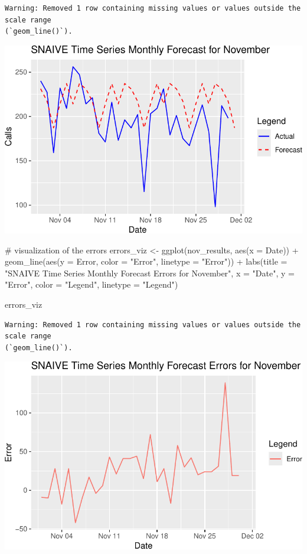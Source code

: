 \documentclass[
  letterpaper,
  DIV=11,
  numbers=noendperiod]{scrartcl}
\newenvironment{Shaded}{\begin{snugshade}}{\end{snugshade}}
\newcommand{\AttributeTok}[1]{\textcolor[rgb]{0.40,0.45,0.13}{#1}}
\newcommand{\CommentTok}[1]{\textcolor[rgb]{0.37,0.37,0.37}{#1}}
\newcommand{\FunctionTok}[1]{\textcolor[rgb]{0.28,0.35,0.67}{#1}}
\newcommand{\NormalTok}[1]{\textcolor[rgb]{0.00,0.23,0.31}{#1}}
\newcommand{\OtherTok}[1]{\textcolor[rgb]{0.00,0.23,0.31}{#1}}
\newcommand{\SpecialCharTok}[1]{\textcolor[rgb]{0.37,0.37,0.37}{#1}}
\newcommand{\StringTok}[1]{\textcolor[rgb]{0.13,0.47,0.30}{#1}}
\begin{document}
\begin{verbatim}
Warning: Removed 1 row containing missing values or values outside the scale range
(`geom_line()`).
\end{verbatim}

\includegraphics{final_proj_group1_files/figure-pdf/unnamed-chunk-23-1.pdf}

\begin{Shaded}
\begin{Highlighting}[]
\CommentTok{\# visualization of the errors}
\NormalTok{errors\_viz }\OtherTok{\textless{}{-}} \FunctionTok{ggplot}\NormalTok{(nov\_results, }\FunctionTok{aes}\NormalTok{(}\AttributeTok{x =}\NormalTok{ Date)) }\SpecialCharTok{+} 
  \FunctionTok{geom\_line}\NormalTok{(}\FunctionTok{aes}\NormalTok{(}\AttributeTok{y =}\NormalTok{ Error, }\AttributeTok{color =} \StringTok{"Error"}\NormalTok{, }\AttributeTok{linetype =} \StringTok{"Error"}\NormalTok{)) }\SpecialCharTok{+}
  \FunctionTok{labs}\NormalTok{(}\AttributeTok{title =} \StringTok{"SNAIVE Time Series Monthly Forecast Errors for November"}\NormalTok{,}
       \AttributeTok{x =} \StringTok{"Date"}\NormalTok{,}
       \AttributeTok{y =} \StringTok{"Error"}\NormalTok{,}
       \AttributeTok{color =} \StringTok{"Legend"}\NormalTok{,}
       \AttributeTok{linetype =} \StringTok{"Legend"}\NormalTok{)}

\NormalTok{errors\_viz}
\end{Highlighting}
\end{Shaded}

\begin{verbatim}
Warning: Removed 1 row containing missing values or values outside the scale range
(`geom_line()`).
\end{verbatim}

\includegraphics{final_proj_group1_files/figure-pdf/unnamed-chunk-24-1.pdf}
\end{document}
